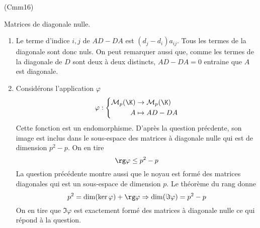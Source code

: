 \begin{tiny}(Cmm16)\end{tiny} Matrices de diagonale nulle.
\begin{enumerate}
  \item Le terme d'indice $i,j$ de $AD-DA$ est $(d_j-d_i)a_{ij}$. Tous les termes de la diagonale sont donc nuls. On peut remarquer aussi que, comme les termes de la diagonale de $D$ sont deux à deux distincts, $AD-DA=0$ entraine que $A$ est diagonale.
  \item Considérons l'application $\varphi$
\begin{displaymath}
  \varphi :
\left\lbrace 
\begin{aligned}
  \mathcal{M}_p(\K) &\rightarrow \mathcal{M}_p(\K) \\ A &\mapsto AD - DA
\end{aligned}
\right. 
\end{displaymath}
Cette fonction est un endomorphisme. D'après la question précdente, son image est inclus dans le sous-espace des matrices à diagonale nulle qui est de dimension $p^2-p$. On en tire $$\rg \varphi \leq p^2-p$$ La question précédente montre aussi que le noyau est formé des matrices diagonales qui est un sous-espace de dimension $p$.
Le théorème du rang donne
\begin{displaymath}
  p^2 = \dim(\ker \varphi) + \rg \varphi \Rightarrow \dim(\Im \varphi) = p^2 - p
\end{displaymath}
On en tire que $\Im \varphi$ est exactement formé des matrices à diagonale nulle ce qui répond à la question.
\end{enumerate}
